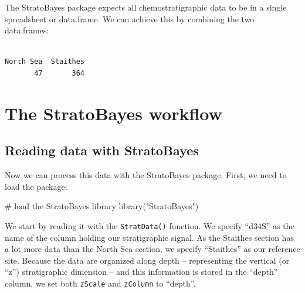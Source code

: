 \documentclass[
  letterpaper,
  DIV=11,
  numbers=noendperiod]{scrartcl}
\newenvironment{Shaded}{\begin{snugshade}}{\end{snugshade}}
\newcommand{\CommentTok}[1]{\textcolor[rgb]{0.37,0.37,0.37}{#1}}
\newcommand{\FloatTok}[1]{\textcolor[rgb]{0.68,0.00,0.00}{#1}}
\newcommand{\FunctionTok}[1]{\textcolor[rgb]{0.28,0.35,0.67}{#1}}
\newcommand{\NormalTok}[1]{\textcolor[rgb]{0.00,0.23,0.31}{#1}}
\newcommand{\OtherTok}[1]{\textcolor[rgb]{0.00,0.23,0.31}{#1}}
\newcommand{\SpecialCharTok}[1]{\textcolor[rgb]{0.37,0.37,0.37}{#1}}
\newcommand{\StringTok}[1]{\textcolor[rgb]{0.13,0.47,0.30}{#1}}
\begin{document}
The StratoBayes package expects all chemostratigraphic data to be in a
single spreadsheet or data.frame. We can achieve this by combining the
two data.frames:

\begin{Shaded}
\end{Shaded}

\begin{verbatim}

North Sea  Staithes 
       47       364 
\end{verbatim}

\section{The StratoBayes workflow}\label{the-stratobayes-workflow}

\subsection{Reading data with
StratoBayes}\label{reading-data-with-stratobayes}

Now we can process this data with the StratoBayes package. First, we
need to load the package:

\begin{Shaded}
\begin{Highlighting}[]
\CommentTok{\# load the StratoBayes library}
\FunctionTok{library}\NormalTok{(}\StringTok{"StratoBayes"}\NormalTok{)}
\end{Highlighting}
\end{Shaded}

We start by reading it with the \texttt{StratData()} function. We
specify ``d34S'' as the name of the column holding our stratigraphic
signal. As the Staithes section has a lot more data than the North Sea
section, we specify ``Staithes'' as our reference site. Because the data
are organized along depth -- representing the vertical (or ``z'')
stratigraphic dimension -- and this information is stored in the
``depth'' column, we set both \texttt{zScale} and \texttt{zColumn} to
``depth''.
\end{document}
